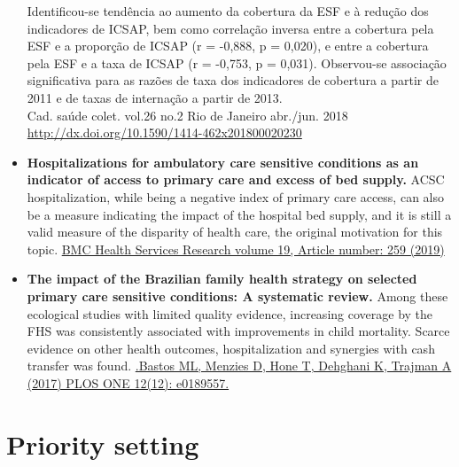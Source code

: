 \documentclass[]{book}
\begin{document}
\begin{itemize}
  Identificou-se tendência ao aumento da cobertura da ESF e à redução dos indicadores de ICSAP, bem como correlação inversa entre a cobertura pela ESF e a proporção de ICSAP (r = -0,888, p = 0,020), e entre a cobertura pela ESF e a taxa de ICSAP (r = -0,753, p = 0,031). Observou-se associação significativa para as razões de taxa dos indicadores de cobertura a partir de 2011 e de taxas de internação a partir de 2013.\\
  Cad. saúde colet. vol.26 no.2 Rio de Janeiro abr./jun. 2018 \url{http://dx.doi.org/10.1590/1414-462x201800020230}
\item
  \textbf{Hospitalizations for ambulatory care sensitive conditions as an indicator of access to primary care and excess of bed supply.} ACSC hospitalization, while being a negative index of primary care access, can also be a measure indicating the impact of the hospital bed supply, and it is still a valid measure of the disparity of health care, the original motivation for this topic. \href{https://bmchealthservres.biomedcentral.com/articles/10.1186/s12913-019-4098-x}{BMC Health Services Research volume 19, Article number: 259 (2019)}
\item
  \textbf{The impact of the Brazilian family health strategy on selected primary care sensitive conditions: A systematic review.} Among these ecological studies with limited quality evidence, increasing coverage by the FHS was consistently associated with improvements in child mortality. Scarce evidence on other health outcomes, hospitalization and synergies with cash transfer was found. \href{https://journals.plos.org/plosone/article?id=10.1371/journal.pone.0182336}{.Bastos ML, Menzies D, Hone T, Dehghani K, Trajman A (2017) PLOS ONE 12(12): e0189557.}
\end{itemize}

\hypertarget{priority-setting}{%
\section*{Priority setting}\label{priority-setting}}
\end{document}
